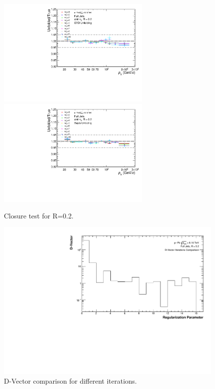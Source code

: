 \documentclass[ALICE]{ALICE_analysis_notes}
\begin{document}
\begin{figure}
    \centering
    \begin{multicols}{2}
            \includegraphics[width=7.5cm]{figures/pPbFigures/UnfoldingComparisons/Closure/RatioClosure1DSvd_R02.pdf}
        \vfill\null
        \columnbreak
            \includegraphics[width=7.5cm]{figures/pPbFigures/UnfoldingComparisons/Closure/RatioClosure1DBayes_R02.pdf}
        \vfill\null
    \end{multicols}
    \caption{Closure test for R=0.2.}
    \label{fig:ClosurepPb}
\end{figure}

\begin{figure}
    \centering
    \includegraphics[width=15cm]{figures/pPbFigures/DVector/DVector_R02.pdf}
    \caption{D-Vector comparison for different iterations.}
    \label{fig:DVectorpPb}
\end{figure}
\end{document}
